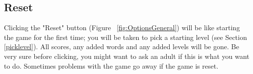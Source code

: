 \documentclass[12pt,a4paper,titlepage,onecolumn]{article}
\begin{document}
		\subsection{Reset}
		Clicking the "Reset" button (Figure ~\ref{fig:OptionsGeneral}) will be like starting the game for the first time; you will be taken to pick a starting level (see Section \ref{picklevel}). All scores, any added words and any added levels will be gone. Be very sure before clicking, you might want to ask an adult if this is what you want to do. Sometimes problems with the game go away if the game is reset.
		
\end{document}
